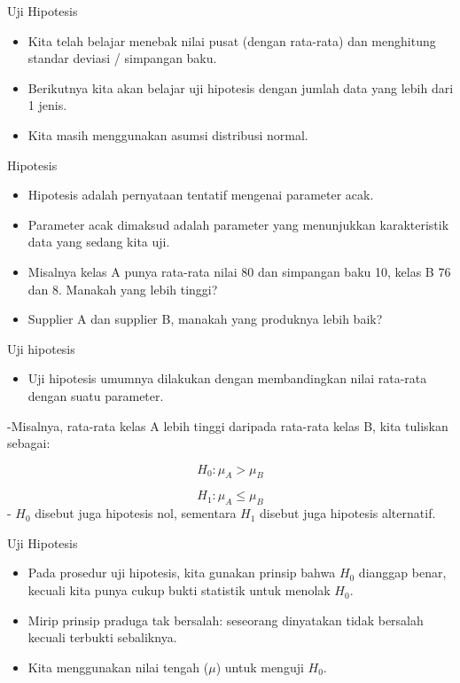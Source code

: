 \documentclass[
  ignorenonframetext,
]{beamer}
\providecommand{\tightlist}{%
  \setlength{\itemsep}{0pt}\setlength{\parskip}{0pt}}\usepackage{longtable,booktabs,array}
\begin{document}
\begin{frame}{Uji Hipotesis}
\label{uji-hipotesis}
\begin{itemize}
\item
  Kita telah belajar menebak nilai pusat (dengan rata-rata) dan
  menghitung standar deviasi / simpangan baku.
\item
  Berikutnya kita akan belajar uji hipotesis dengan jumlah data yang
  lebih dari 1 jenis.
\item
  Kita masih menggunakan asumsi distribusi normal.
\end{itemize}
\end{frame}

\begin{frame}{Hipotesis}
\label{hipotesis}
\begin{itemize}
\item
  Hipotesis adalah pernyataan tentatif mengenai parameter acak.
\item
  Parameter acak dimaksud adalah parameter yang menunjukkan
  karakteristik data yang sedang kita uji.
\item
  Misalnya kelas A punya rata-rata nilai 80 dan simpangan baku 10, kelas
  B 76 dan 8. Manakah yang lebih tinggi?
\item
  Supplier A dan supplier B, manakah yang produknya lebih baik?
\end{itemize}
\end{frame}

\begin{frame}{Uji hipotesis}
\label{uji-hipotesis-1}
\begin{itemize}
\tightlist
\item
  Uji hipotesis umumnya dilakukan dengan membandingkan nilai rata-rata
  dengan suatu parameter.
\end{itemize}

-Misalnya, rata-rata kelas A lebih tinggi daripada rata-rata kelas B,
kita tuliskan sebagai:

\[
H_0: \mu_A > \mu_B
\]

\[
H_1: \mu_A \leq \mu_B
\] - \(H_0\) disebut juga hipotesis nol, sementara \(H_1\) disebut juga
hipotesis alternatif.
\end{frame}

\begin{frame}{Uji Hipotesis}
\label{uji-hipotesis-2}
\begin{itemize}
\item
  Pada prosedur uji hipotesis, kita gunakan prinsip bahwa \(H_0\)
  dianggap benar, kecuali kita punya cukup bukti statistik untuk menolak
  \(H_0\).
\item
  Mirip prinsip praduga tak bersalah: seseorang dinyatakan tidak
  bersalah kecuali terbukti sebaliknya.
\item
  Kita menggunakan nilai tengah (\(\mu\)) untuk menguji \(H_0\).
\end{itemize}
\end{frame}
\end{document}
